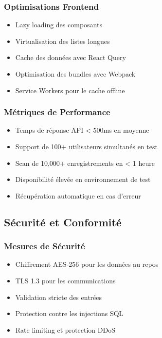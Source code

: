 \documentclass[12pt,a4paper]{article}
\begin{document}
\subsubsection{Optimisations Frontend}
\begin{itemize}
    \item Lazy loading des composants
    \item Virtualisation des listes longues
    \item Cache des données avec React Query
    \item Optimisation des bundles avec Webpack
    \item Service Workers pour le cache offline
\end{itemize}

\subsubsection{Métriques de Performance}
\begin{itemize}
    \item Temps de réponse API < 500ms en moyenne
    \item Support de 100+ utilisateurs simultanés en test
    \item Scan de 10,000+ enregistrements en < 1 heure
    \item Disponibilité élevée en environnement de test
    \item Récupération automatique en cas d'erreur
\end{itemize}

\subsection{Sécurité et Conformité}

\subsubsection{Mesures de Sécurité}
\begin{itemize}
    \item Chiffrement AES-256 pour les données au repos
    \item TLS 1.3 pour les communications
    \item Validation stricte des entrées
    \item Protection contre les injections SQL
    \item Rate limiting et protection DDoS
\end{itemize}
\end{document}
